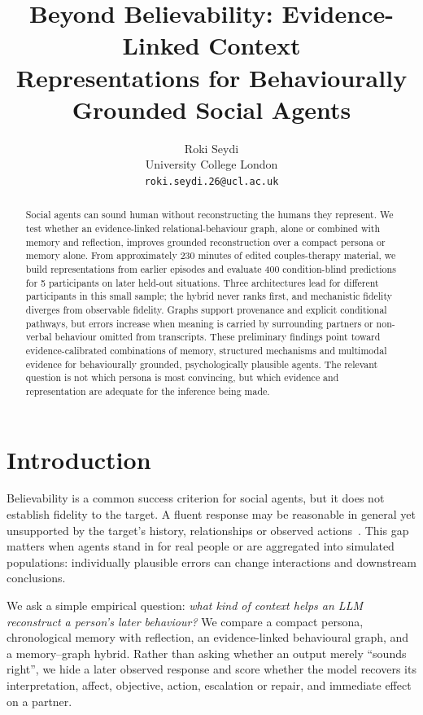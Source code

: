 \documentclass{article}
\title{Beyond Believability: Evidence-Linked Context\\Representations for Behaviourally Grounded Social Agents}
\author{%
  Roki Seydi \\
  University College London \\
  \texttt{roki.seydi.26@ucl.ac.uk}
}
\begin{document}
\maketitle

\begin{abstract}
Social agents can sound human without reconstructing the humans they represent.
We test whether an evidence-linked relational-behaviour graph, alone or combined
with memory and reflection, improves grounded reconstruction over a compact
persona or memory alone. From approximately 230 minutes of edited couples-therapy
material, we build representations from earlier episodes and evaluate 400
condition-blind predictions for 5 participants on later held-out situations. Three
architectures lead for different participants in this small sample; the hybrid never
ranks first, and mechanistic fidelity diverges from observable fidelity. Graphs
support provenance and explicit conditional pathways, but errors increase when
meaning is carried by surrounding partners or non-verbal behaviour omitted from
transcripts. These preliminary findings point toward evidence-calibrated
combinations of memory, structured mechanisms and multimodal evidence for
behaviourally grounded, psychologically plausible agents. The relevant question is
not which persona is most convincing, but which evidence and representation are
adequate for the inference being made.
\end{abstract}

\section{Introduction}

Believability is a common success criterion for social agents, but it does not establish fidelity to
the target. A fluent response may be reasonable in general yet unsupported by the target's history,
relationships or observed actions~\cite{wang2025llm,wu2025boundary,lu2025llm}. This gap matters when agents stand in for
real people or are aggregated into simulated populations: individually plausible errors can change
interactions and downstream conclusions.

We ask a simple empirical question: \textit{what kind of context helps an LLM reconstruct a person's
later behaviour?} We compare a compact persona, chronological memory with reflection, an
evidence-linked behavioural graph, and a memory--graph hybrid. Rather than asking whether an
output merely ``sounds right'', we hide a later observed response and score whether the model
recovers its interpretation, affect, objective, action, escalation or repair, and immediate effect on
a partner.
\end{document}
